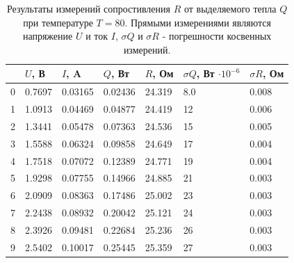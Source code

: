 \documentclass[12pt]{article}
\begin{document}
\begin{table}[H]
    \centering
    \begin{tabular}{|l|l|l|l|l|l|l|}
        \hline
          & $U$, В & $I$, A  & $Q$, Вт & $R$, Ом & $\sigma Q$, Вт $\cdot 10^{-6}$ & $\sigma R$, Ом \\
        \hline
        0 & 0.7697 & 0.03165 & 0.02436 & 24.319  & 8.0                            & 0.008          \\
        1 & 1.0913 & 0.04469 & 0.04877 & 24.419  & 12                             & 0.006          \\
        2 & 1.3441 & 0.05478 & 0.07363 & 24.536  & 15                             & 0.005          \\
        3 & 1.5588 & 0.06324 & 0.09858 & 24.649  & 17                             & 0.004          \\
        4 & 1.7518 & 0.07072 & 0.12389 & 24.771  & 19                             & 0.004          \\
        5 & 1.9298 & 0.07755 & 0.14966 & 24.885  & 21                             & 0.003          \\
        6 & 2.0909 & 0.08363 & 0.17486 & 25.002  & 23                             & 0.003          \\
        7 & 2.2438 & 0.08932 & 0.20042 & 25.121  & 24                             & 0.003          \\
        8 & 2.3926 & 0.09481 & 0.22684 & 25.236  & 26                             & 0.003          \\
        9 & 2.5402 & 0.10017 & 0.25445 & 25.359  & 27                             & 0.003          \\
        \hline
    \end{tabular}
    
    \caption{Результаты измерений сопростивления \(R\) от выделяемого тепла \(Q\) при температуре \(T = 80\)\textcelsius.
        Прямыми измерениями являются напряжение \(U\) и ток \(I\), \(\sigma Q\) и \(\sigma R\) - погрешности косвенных измерений.}
    \label{tab:7}
\end{table}
\end{document}
